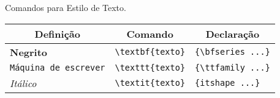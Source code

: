 \begin{quadro}[!htb]
    \centering
    \caption{Comandos para Estilo de Texto.\label{qua:quadro-comandos-estilo-texto}}
        \begin{tabular}{|l|l|l|}
            \hline
                \multicolumn{1}{|c|}{\textbf{Definição}} & \multicolumn{1}{c|}{\textbf{Comando}} & \multicolumn{1}{c|}{\textbf{Declaração}} \\ \hline
                \textbf{Negrito}                         & \verb|\textbf{texto}|                 & \verb|{\bfseries ...}|                    \\ \hline
                \texttt{Máquina de escrever}             & \verb|\texttt{texto}|                 & \verb|{\ttfamily ...}|                     \\ \hline
                \textit{Itálico}                         & \verb|\textit{texto}|                 & \verb|{itshape ...}|                        \\ \hline
        \end{tabular}
\end{quadro}